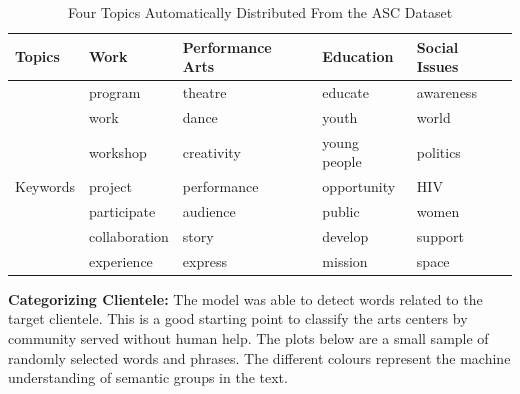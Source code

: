 \documentclass{article}
\renewcommand{\arraystretch}{.2}
\begin{document}
\vspace{.8cm}

\begin{table}[H]
\centering
\renewcommand{\arraystretch}{1}
\caption*{Four Topics Automatically Distributed From the ASC Dataset}

\begin{tabular}{| p{1.5cm}|| p{2cm} | p{2cm} | p{2cm} | p{2cm} |}
\hline
      Topics & Work & Performance Arts & Education & Social Issues\\
\hline \hline
          & program & theatre & educate& awareness \\
          & work & dance & youth& world \\
          & workshop  & creativity & young people& politics \\
 Keywords & project  & performance & opportunity& HIV \\
          & participate  & audience & public& women \\
          & collaboration  & story & develop& support \\
          & experience  & express & mission& space \\


\hline 
\end{tabular}
\renewcommand{\arraystretch}{1}
\label{tab:R}
\end{table}

\vspace{.8cm}

\noindent
\textbf{Categorizing Clientele:} The model was able to detect words related to the target clientele. This is a good starting point to classify the arts centers by community served without human help. The plots below are a small sample of randomly selected words and phrases. The different colours represent the machine understanding of semantic groups in the text. 

\vspace{1cm}
\end{document}
